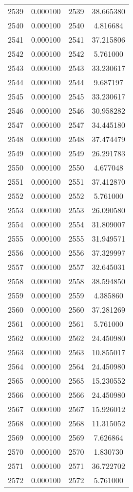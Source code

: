 \documentclass[12pt]{article}
\begin{document}
\begin{longtable}{@{}cccc@{}}
2539 & 0.000100 & 2539 & 38.665380 \\
2540 & 0.000100 & 2540 & 4.816684 \\
2541 & 0.000100 & 2541 & 37.215806 \\
2542 & 0.000100 & 2542 & 5.761000 \\
2543 & 0.000100 & 2543 & 33.230617 \\
2544 & 0.000100 & 2544 & 9.687197 \\
2545 & 0.000100 & 2545 & 33.230617 \\
2546 & 0.000100 & 2546 & 30.958282 \\
2547 & 0.000100 & 2547 & 34.445180 \\
2548 & 0.000100 & 2548 & 37.474479 \\
2549 & 0.000100 & 2549 & 26.291783 \\
2550 & 0.000100 & 2550 & 4.677048 \\
2551 & 0.000100 & 2551 & 37.412870 \\
2552 & 0.000100 & 2552 & 5.761000 \\
2553 & 0.000100 & 2553 & 26.090580 \\
2554 & 0.000100 & 2554 & 31.809007 \\
2555 & 0.000100 & 2555 & 31.949571 \\
2556 & 0.000100 & 2556 & 37.329997 \\
2557 & 0.000100 & 2557 & 32.645031 \\
2558 & 0.000100 & 2558 & 38.594850 \\
2559 & 0.000100 & 2559 & 4.385860 \\
2560 & 0.000100 & 2560 & 37.281269 \\
2561 & 0.000100 & 2561 & 5.761000 \\
2562 & 0.000100 & 2562 & 24.450980 \\
2563 & 0.000100 & 2563 & 10.855017 \\
2564 & 0.000100 & 2564 & 24.450980 \\
2565 & 0.000100 & 2565 & 15.230552 \\
2566 & 0.000100 & 2566 & 24.450980 \\
2567 & 0.000100 & 2567 & 15.926012 \\
2568 & 0.000100 & 2568 & 11.315052 \\
2569 & 0.000100 & 2569 & 7.626864 \\
2570 & 0.000100 & 2570 & 1.830730 \\
2571 & 0.000100 & 2571 & 36.722702 \\
2572 & 0.000100 & 2572 & 5.761000 \\

\end{longtable}
\end{document}

